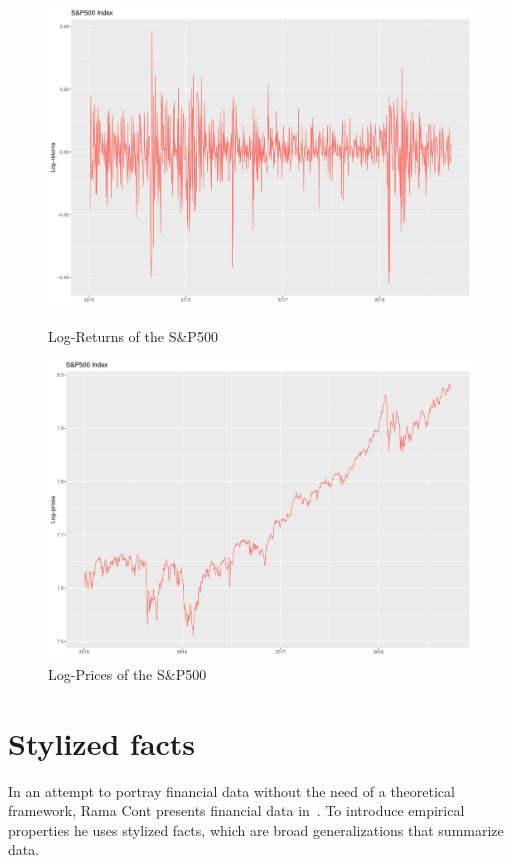 \begin{figure}[htbp]
\centering
	\begin{minipage}{.5\textwidth}
		\centering
		\includegraphics[scale=.25]{img/finData/logReturns}
		\caption{Log-Returns of the S\&P500}
		\label{fig:logReturnsSP500}
	\end{minipage}%
	\begin{minipage}{.5\textwidth}
		\centering
		\includegraphics[scale=.25]{img/finData/logPrices}
		\caption{Log-Prices of the S\&P500}
		\label{fig:logPricesSP500}
	\end{minipage}
\end{figure}

\section{Stylized facts}
\label{sec:stylizedFacts}
In an attempt to portray financial data without the need of a theoretical 
framework, Rama Cont presents financial data in~\cite{stylizedFacts}. To 
introduce empirical properties he uses stylized facts, which are 
broad generalizations that summarize data.\\

